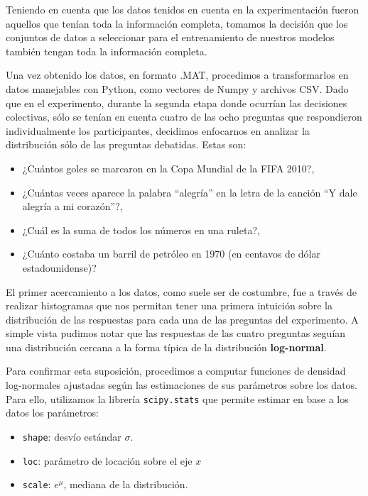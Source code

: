 Teniendo en cuenta que los datos tenidos en cuenta en la experimentación fueron aquellos que tenían toda la información completa, tomamos la decisión que los conjuntos de datos a seleccionar para el entrenamiento de nuestros modelos también tengan toda la información completa. 

Una vez obtenido los datos, en formato .MAT, procedimos a transformarlos en datos manejables con Python, como vectores de Numpy y archivos CSV. Dado que en el experimento, durante la segunda etapa donde ocurrían las decisiones colectivas, sólo se tenían en cuenta cuatro de las ocho preguntas que respondieron individualmente los participantes, decidimos enfocarnos en analizar la distribución sólo de las preguntas debatidas. Estas son:

\begin{itemize}
    \item ¿Cuántos goles se marcaron en la Copa Mundial de la FIFA 2010?,
    \item ¿Cuántas veces aparece la palabra “alegría” en la letra de la canción “Y dale alegría a mi corazón”?,
    \item ¿Cuál es la suma de todos los números en una ruleta?,
    \item ¿Cuánto costaba un barril de petróleo en 1970 (en centavos de dólar estadounidense)?
\end{itemize}

El primer acercamiento a los datos, como suele ser de costumbre, fue a través de realizar histogramas que nos permitan tener una primera intuición sobre la distribución de las respuestas para cada una de las preguntas del experimento. A simple vista pudimos notar que las respuestas de las cuatro preguntas seguían una distribución cercana a la forma típica de la distribución \textbf{log-normal}. 

Para confirmar esta suposición, procedimos a computar funciones de densidad log-normales ajustadas según las estimaciones de sus parámetros sobre los datos. Para ello, utilizamos la librería \texttt{scipy.stats} que permite estimar en base a los datos los parámetros:

\begin{itemize}
    \item \texttt{shape}: desvío estándar $\sigma$.
    \item \texttt{loc}: parámetro de locación sobre el eje $x$
    \item \texttt{scale}: $e^{\mu}$, mediana de la distribución.
\end{itemize}

